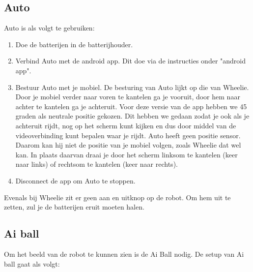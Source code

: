 \documentclass[12pt,a4paper]{article}
\begin{document}
\subsection{Auto}
Auto is als volgt te gebruiken:

\begin{enumerate}
	\item Doe de batterijen in de batterijhouder.
	\item Verbind Auto met de android app. Dit doe via de instructies onder "android app".
	\item Bestuur Auto met je mobiel. 
	De besturing van Auto lijkt op die van Wheelie. Door je mobiel verder naar voren te kantelen ga je vooruit, door hem naar achter te kantelen ga je achteruit. Voor deze versie van de app hebben we 45 graden als neutrale positie gekozen. Dit hebben we gedaan zodat je ook als je achteruit rijdt, nog op het scherm kunt kijken en dus door middel van de videoverbinding kunt bepalen waar je rijdt. Auto heeft geen positie sensor. Daarom kan hij niet de positie van je mobiel volgen, zoals Wheelie dat wel kan. In plaats daarvan draai je door het scherm linksom te kantelen (keer naar links) of rechtsom te kantelen (keer naar rechts).
	\item Disconnect de app om Auto te stoppen.
\end{enumerate}

Evenals bij Wheelie zit er geen aan en uitknop op de robot. Om hem uit te zetten, zul je de batterijen eruit moeten halen.

\subsection{Ai ball}
Om het beeld van de robot te kunnen zien is de Ai Ball nodig. De setup van Ai ball gaat als volgt: 
\end{document}
